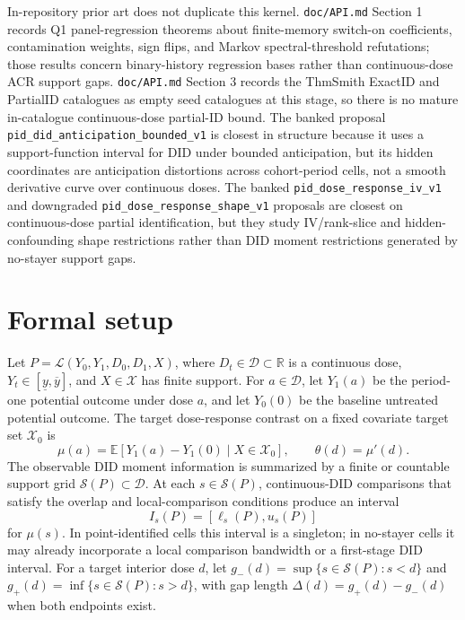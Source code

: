 \documentclass[11pt]{article}
\newcommand{\E}{\mathbb{E}}
\theoremstyle{definition}
\theoremstyle{plain}
\theoremstyle{remark}
\begin{document}
In-repository prior art does not duplicate this kernel.  \texttt{doc/API.md} Section 1 records Q1 panel-regression theorems about finite-memory switch-on coefficients, contamination weights, sign flips, and Markov spectral-threshold refutations; those results concern binary-history regression bases rather than continuous-dose ACR support gaps.  \texttt{doc/API.md} Section 3 records the ThmSmith ExactID and PartialID catalogues as empty seed catalogues at this stage, so there is no mature in-catalogue continuous-dose partial-ID bound.  The banked proposal \texttt{pid\_did\_anticipation\_bounded\_v1} is closest in structure because it uses a support-function interval for DID under bounded anticipation, but its hidden coordinates are anticipation distortions across cohort-period cells, not a smooth derivative curve over continuous doses.  The banked \texttt{pid\_dose\_response\_iv\_v1} and downgraded \texttt{pid\_dose\_response\_shape\_v1} proposals are closest on continuous-dose partial identification, but they study IV/rank-slice and hidden-confounding shape restrictions rather than DID moment restrictions generated by no-stayer support gaps.

\section{Formal setup}
Let \(P=\mathcal L(Y_0,Y_1,D_0,D_1,X)\), where \(D_t\in\mathcal D\subset\mathbb R\) is a continuous dose, \(Y_t\in[\underline y,\overline y]\), and \(X\in\mathcal X\) has finite support.  For \(a\in\mathcal D\), let \(Y_1(a)\) be the period-one potential outcome under dose \(a\), and let \(Y_0(0)\) be the baseline untreated potential outcome.  The target dose-response contrast on a fixed covariate target set \(\mathcal X_0\) is
\[
  \mu(a)=\E[Y_1(a)-Y_1(0)\mid X\in\mathcal X_0],
  \qquad
  \theta(d)=\mu'(d).
\]
The observable DID moment information is summarized by a finite or countable support grid \(\mathcal S(P)\subset\mathcal D\).  At each \(s\in\mathcal S(P)\), continuous-DID comparisons that satisfy the overlap and local-comparison conditions produce an interval
\[
  I_s(P)=[\ell_s(P),u_s(P)]
\]
for \(\mu(s)\).  In point-identified cells this interval is a singleton; in no-stayer cells it may already incorporate a local comparison bandwidth or a first-stage DID interval.  For a target interior dose \(d\), let \(g_-(d)=\sup\{s\in\mathcal S(P):s<d\}\) and \(g_+(d)=\inf\{s\in\mathcal S(P):s>d\}\), with gap length \(\Delta(d)=g_+(d)-g_-(d)\) when both endpoints exist.
\end{document}
